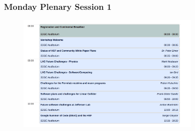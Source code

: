 \begin{frame}
\frametitle{Monday Plenary Session 1}

\begin{figure}[htbp]
\begin{center}
\includegraphics[width=0.8\textwidth]{images/hsf-sdsc-monday1.png}
\end{center}
\end{figure}


\end{frame}


